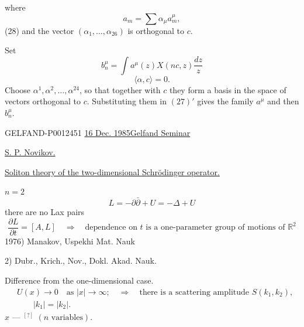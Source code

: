 where
\begin{equation*}
a_m=\sum\alpha_\mu a_m^\mu,\tag*{$(27)'$}
\end{equation*}
(28) and the vector $(\alpha_1,\ldots,\alpha_{26})$ is orthogonal to $c$.

Set
\begin{equation*}
b_n^\mu=\int a^\mu(z)X(nc,z)\frac{dz}{z}\tag{29}
\end{equation*}
\begin{equation*}
\langle\alpha,c\rangle=0.\tag{30}
\end{equation*}
Choose $\alpha^1,\alpha^2,\ldots,\alpha^{24}$, so that together with $c$ they form a basis in the space of vectors orthogonal to $c$. Substituting them in $(27)'$ gives the family $a^\mu$ and then $b_n^\mu$.


\begin{GelfandAdjacentEvidence}{GELFAND-P001245}{1}
\underline{16 Dec. 1985}\qquad \underline{Gelfand Seminar}

\underline{S. P. Novikov.}

\underline{Soliton theory of the two-dimensional Schrödinger operator.}

\underline{$n=2$}
\begin{equation*}
L=-\partial\bar\partial+U=-\Delta+U\tag{1}
\end{equation*}
there are no Lax pairs
\begin{equation*}
\frac{\partial L}{\partial t}=[A,L]
\quad\Rightarrow\quad
\text{dependence on }t\text{ is a one-parameter group of motions of }\mathbb R^2\tag{2}
\end{equation*}
1976) Manakov, Uspekhi Mat. Nauk

\hspace{2em}2) Dubr., Krich., Nov., Dokl. Akad. Nauk.

Difference from the one-dimensional case.
\begin{equation*}
\begin{aligned}
&U(x)\to0\quad\text{as }|x|\to\infty;\quad\Rightarrow\quad\text{there is a scattering amplitude }S(k_1,k_2),\\
&\hspace{2em}|k_1|=|k_2|.
\end{aligned}\tag{3}
\end{equation*}
$x$ — $^{[\text{?}]}$ $(n\text{ variables})$.
\end{GelfandAdjacentEvidence}
